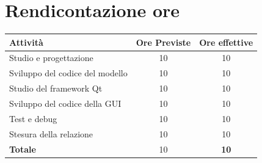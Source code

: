 \documentclass[a4paper, 10pt]{article}
\begin{document}
    \section*{Rendicontazione ore}
    \begin{center}
        \begin{tabular}{|l|c|c|}
            \hline
            \textbf{Attività} & \textbf{Ore Previste} & \textbf{Ore effettive} \\
            \hline
            Studio e progettazione & 10 & 10 \\
            \hline
            Sviluppo del codice del modello & 10 & 10 \\
            \hline
            Studio del framework Qt & 10 & 10 \\
            \hline
            Sviluppo del codice della GUI & 10 & 10 \\
            \hline
            Test e debug & 10 & 10 \\
            \hline
            Stesura della relazione & 10 & 10 \\
            \hline
            \textbf{Totale} & 10 & \textbf{10} \\
            \hline
        \end{tabular}
    \end{center}
\end{document}
